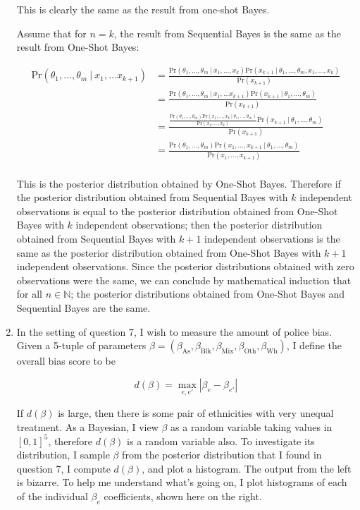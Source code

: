 \documentclass[10pt,\jkfside,a4paper]{article}
\begin{document}
\begin{enumerate}
This is clearly the same as the result from one-shot Bayes.

Assume that for $n = k$, the result from Sequential Bayes is the same as the
result from One-Shot Bayes:

\[
\begin{split}
\text{Pr}(\theta_1, \dots, \theta_m \ | \ x_1, \dots x_{k+1})
&= \frac{\text{Pr}(\theta_1, \dots, \theta_m \ | \ x_1, \dots, x_k)
\text{Pr}(x_{k+1} \ | \ \theta_1, \dots, \theta_m, x_1, \dots, x_k)}{\text{Pr}
(x_{k+1})} \\
&= \frac{\text{Pr}(\theta_1, \dots, \theta_m \ | \ x_1, \dots x_{k+1})\text{Pr}
(x_{k+1} \ | \ \theta_1, \dots, \theta_m)}{\text{Pr}(x_{k+1})} \\
&= \frac{\frac{\text{Pr}(\theta_1, \dots, \theta_m)\text{Pr}(x_1, \dots, x_k
 \ | \ \theta_1, \dots, \theta_m)}{\text{Pr}(x_1, \dots, x_k)}\text{Pr}
(x_{k+1} \ | \ \theta_1, \dots, \theta_m)}{\text{Pr}(x_{k+1})} \\
&= \frac{\text{Pr}(\theta_1, \dots, \theta_m)\text{Pr}(x_1, \dots, x_{k+1}
 \ | \ \theta_1, \dots, \theta_m)}{\text{Pr}(x_1, \dots, x_{k+1})} \\
\end{split}
\]

This is the posterior distribution obtained by One-Shot Bayes. Therefore if
the posterior distribution obtained from Sequential Bayes with $k$
independent observations is equal to the posterior distribution obtained
from One-Shot Bayes with $k$ independent observations; then the posterior
distribution obtained from Sequential Bayes with $k + 1$ independent
observations is the same as the posterior distribution obtained from
One-Shot Bayes with $k + 1$ independent observations. Since the posterior
distributions obtained with zero observations were the same, we can conclude
by mathematical induction that for all $n \in \mathbb{N}$; the posterior
distributions obtained from One-Shot Bayes and Sequential Bayes are the same.

\item In the setting of question 7, I wish to measure the amount of police
bias. Given a 5-tuple of parameters $\beta = (\beta_{\text{As}},
\beta_{\text{Blk}}, \beta_{\text{Mix}}, \beta_{\text{Oth}},
\beta_{\text{Wh}})$, I define the overall bias score to be

\[
d(\beta) = \max_{e, e'}\left|\beta_e - \beta_{e'}\right|
\]

If $d(\beta)$ is large, then there is some pair of ethnicities with very
unequal treatment. As a Bayesian, I view $\beta$ as a random variable taking
values in $[0, 1]^5$, therefore $d(\beta)$ is a random variable also. To
investigate its distribution, I sample $\beta$ from the posterior
distribution that I found in question 7, I compute $d(\beta)$, and plot a
histogram. The output from the left is bizarre. To help me understand what's
going on, I plot histograms of each of the individual $\beta_e$
coefficients, shown here on the right.


\end{enumerate}
\end{document}
